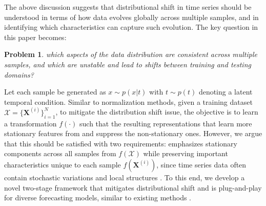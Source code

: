 \documentclass[sigconf,anonymous,review]{acmart}
\newtheorem{myPro}{\textbf{Problem}}
\begin{document}
The above discussion suggests that distributional shift in time series should be understood in terms of how data evolves globally across multiple samples, and in identifying which characteristics can capture such evolution.
The key question in this paper becomes:


\begin{myPro}
\label{Pro:LearningStationaryRepresentations}
which aspects of the data distribution are consistent across multiple samples, and which are unstable and lead to shifts between training and testing domains?
\end{myPro}
Let each sample be generated as $x \sim p(x | t)$ with $t \sim p(t)$ denoting a latent temporal condition.
Similar to normalization methods, given a training dataset $\mathcal{X} = \{\mathbf{X}^{(i)}\}_{i=1}^N$, to mitigate the distribution shift issue, the objective is to learn a transformation $f(\cdot)$ such that the resulting representations that learn more stationary features from and suppress the non-stationary ones.
However, we argue that this should be satisfied with two requirements:
emphasizes stationary components across all samples from $f(\mathcal{X})$ while preserving important characteristics unique to each sample $f(\mathbf{X}^{(i)})$, since time series data often contain stochastic variations and local structures \citep{Piao2024fredformer}.
To this end, we develop a novel two-stage framework that mitigates distributional shift and is plug-and-play for diverse forecasting models, similar to existing methods \citep{kim2021RevIN, ye2024FAN, han2024sin}.

\end{document}
